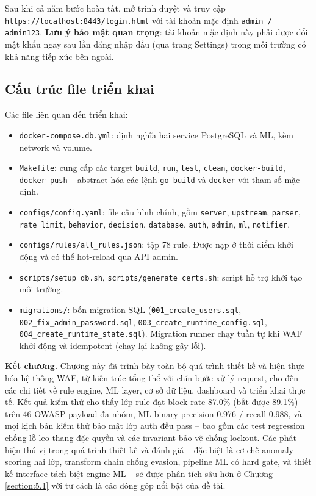 \documentclass[../DoAn.tex]{subfiles}
\begin{document}
Sau khi cả năm bước hoàn tất, mở trình duyệt và truy cập
\texttt{https://localhost:8443/login.html} với tài khoản mặc định
\texttt{admin / admin123}. \textbf{Lưu ý bảo mật quan trọng}: tài khoản
mặc định này phải được đổi mật khẩu ngay sau lần đăng nhập đầu (qua trang
Settings) trong môi trường có khả năng tiếp xúc bên ngoài.

\subsection{Cấu trúc file triển khai}
\label{subsection:4.7.3}

Các file liên quan đến triển khai:

\begin{itemize}[leftmargin=*]
    \item \texttt{docker-compose.db.yml}: định nghĩa hai service PostgreSQL
    và ML, kèm network và volume.

    \item \texttt{Makefile}: cung cấp các target \texttt{build}, \texttt{run},
    \texttt{test}, \texttt{clean}, \texttt{docker-build}, \texttt{docker-push}
    -- abstract hóa các lệnh \texttt{go build} và \texttt{docker} với
    tham số mặc định.

    \item \texttt{configs/config.yaml}: file cấu hình chính, gồm
    \texttt{server}, \texttt{upstream}, \texttt{parser}, \texttt{rate\_limit},
    \texttt{behavior}, \texttt{decision}, \texttt{database}, \texttt{auth},
    \texttt{admin}, \texttt{ml}, \texttt{notifier}.

    \item \texttt{configs/rules/all\_rules.json}: tập 78 rule. Được nạp ở
    thời điểm khởi động và có thể hot-reload qua API admin.

    \item \texttt{scripts/setup\_db.sh}, \texttt{scripts/generate\_certs.sh}:
    script hỗ trợ khởi tạo môi trường.

    \item \texttt{migrations/}: bốn migration SQL (\texttt{001\_create\_users.sql},
    \texttt{002\_fix\_admin\_password.sql}, \texttt{003\_create\_runtime\_config.sql},
    \texttt{004\_create\_runtime\_state.sql}). Migration runner chạy tuần
    tự khi WAF khởi động và idempotent (chạy lại không gây lỗi).
\end{itemize}

\bigskip
\noindent\textbf{Kết chương.}
Chương này đã trình bày toàn bộ quá trình thiết kế và hiện thực hóa hệ
thống WAF, từ kiến trúc tổng thể với chín bước xử lý request, cho đến các
chi tiết về rule engine, ML layer, cơ sở dữ liệu, dashboard và triển khai
thực tế. Kết quả kiểm thử cho thấy lớp rule đạt block rate 87.0\% (bắt được
89.1\%) trên 46 OWASP payload đa nhóm, ML binary precision 0.976 / recall 0.988, và mọi
kịch bản kiểm thử bảo mật lớp auth đều pass -- bao gồm các test regression
chống lỗ leo thang đặc quyền và các invariant bảo vệ chống lockout. Các
phát hiện thú vị trong quá trình thiết kế và đánh giá -- đặc biệt là cơ
chế anomaly scoring hai lớp, transform chain chống evasion, pipeline ML
có hard gate, và thiết kế interface tách biệt engine-ML -- sẽ được phân
tích sâu hơn ở Chương \ref{section:5.1} với tư cách là các đóng góp nổi
bật của đề tài.
\end{document}
